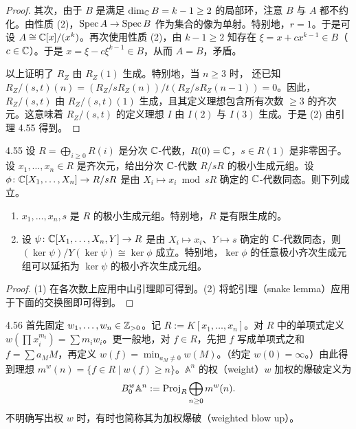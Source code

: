\begin{proof}
其次，由于 $B$ 是满足 $\dim_{\mathbb{C}}B=k-1\ge 2$ 的局部环，注意 $B$ 与 $A$ 都不约化。由性质 (2)，$\operatorname{Spec} A\to\operatorname{Spec} B$ 作为集合的像为单射。特别地，$r=1$。于是可设 $A\cong\mathbb{C}[x]/(x^k)$。再次使用性质 (2)，由 $k-1\ge 2$ 知存在 $\xi=x+cx^{k-1}\in B$（$c\in\mathbb{C}$）。于是 $x=\xi-c\xi^{k-1}\in B$，从而 $A=B$，矛盾。

以上证明了 $R_Z$ 由 $R_Z(1)$ 生成。特别地，当 $n\ge 3$ 时，
还已知 $R_Z/(s,t)(n)=(R_Z/sR_Z(n))/t(R_Z/sR_Z(n-1))=0$。因此，$R_Z/(s,t)$ 由 $R_Z/(s,t)(1)$ 生成，且其定义理想包含所有次数 $\ge 3$ 的齐次元。这意味着 $R_Z/(s,t)$ 的定义理想 $I$ 由 $I(2)$ 与 $I(3)$ 生成。于是 (2) 由引理 4.55 得到。
\end{proof}

\begin{lemmap}{4.55}
设 $R=\bigoplus_{i\ge 0}R(i)$ 是分次 $\mathbb{C}$-代数，$R(0)=\mathbb{C}$，$s\in R(1)$ 是非零因子。设 $x_1,\dots,x_n\in R$ 是齐次元，给出分次 $\mathbb{C}$-代数 $R/sR$ 的极小生成元组。设 $\phi\colon\mathbb{C}[X_1,\dots,X_n]\to R/sR$ 是由 $X_i\mapsto x_i\bmod sR$ 确定的 $\mathbb{C}$-代数同态。则下列成立。
\begin{enumerate}[label=(\arabic*),leftmargin=2.4em,itemsep=1pt,topsep=2pt]
\item $x_1,\dots,x_n,s$ 是 $R$ 的极小生成元组。特别地，$R$ 是有限生成的。
\item 设 $\psi\colon\mathbb{C}[X_1,\dots,X_n,Y]\to R$ 是由 $X_i\mapsto x_i$、$Y\mapsto s$ 确定的 $\mathbb{C}$-代数同态，则 $(\ker\psi)/Y(\ker\psi)\cong\ker\phi$ 成立。特别地，$\ker\phi$ 的任意极小齐次生成元组可以延拓为 $\ker\psi$ 的极小齐次生成元组。
\end{enumerate}
\end{lemmap}

\begin{proof}
(1) 在各次数上应用中山引理即可得到。(2) 将蛇引理（snake lemma）应用于下面的交换图即可得到。
\end{proof}

\begin{definitionp}{4.56}
首先固定 $w_1,\dots,w_n\in\mathbb{Z}_{>0}$。记 $R:=K[x_1,\dots,x_n]$。对 $R$ 中的单项式定义 $w(\prod x_i^{m_i})=\sum m_iw_i$。更一般地，对 $f\in R$，先把 $f$ 写成单项式之和 $f=\sum a_MM$，再定义 $w(f)=\min_{a_M\neq 0}w(M)$。（约定 $w(0)=\infty$。）由此得到理想 $m^w(n)=\{f\in R\mid w(f)\ge n\}$。$\mathbb{A}^n$ 的权（weight）$w$ 加权的爆破定义为
\[ B_0^w\mathbb{A}^n:=\operatorname{Proj}_R\bigoplus_{n\ge 0}m^w(n). \]
不明确写出权 $w$ 时，有时也简称其为加权爆破（weighted blow up）。
\end{definitionp}
